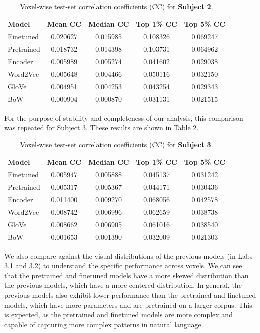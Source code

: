 \documentclass[10pt,letterpaper]{article}
\begin{document}
\begin{table}[ht]
\centering
\caption{Voxel-wise test-set correlation coefficients (CC) for \textbf{Subject 2}.}
\label{tab:cc_subject2_full}
\begin{tabular}{lcccc}
\toprule
\textbf{Model} &
\textbf{Mean CC} &
\textbf{Median CC} &
\textbf{Top 1\% CC} &
\textbf{Top 5\% CC} \\
\midrule
Finetuned  & 0.020627 & 0.015985 & 0.108326 & 0.069247 \\
Pretrained & 0.018732 & 0.014398 & 0.103731 & 0.064962 \\
Encoder    & 0.005989 & 0.005274 & 0.041602 & 0.029038 \\
Word2Vec   & 0.005648 & 0.004466 & 0.050116 & 0.032150 \\
GloVe      & 0.004951 & 0.004253 & 0.043254 & 0.029343 \\
BoW        & 0.000904 & 0.000870 & 0.031131 & 0.021515 \\
\bottomrule
\end{tabular}
\end{table}

For the purpose of stability and completeness of our analysis, this comparison was repeated for Subject 3. These results are shown in Table \ref{tab:cc_subject3_full}.



\begin{table}[ht]
\centering
\caption{Voxel-wise test-set correlation coefficients (CC) for \textbf{Subject 3}.}
\label{tab:cc_subject3_full}
\begin{tabular}{lcccc}
\toprule
\textbf{Model} &
\textbf{Mean CC} &
\textbf{Median CC} &
\textbf{Top 1\% CC} &
\textbf{Top 5\% CC} \\
\midrule
Finetuned  & 0.005947 & 0.005888 & 0.045137 & 0.031242 \\
Pretrained & 0.005317 & 0.005367 & 0.044171 & 0.030436 \\
Encoder    & 0.011400 & 0.009270 & 0.068056 & 0.042578 \\
Word2Vec   & 0.008742 & 0.006996 & 0.062659 & 0.038738 \\
GloVe      & 0.008662 & 0.006905 & 0.061016 & 0.038540 \\
BoW        & 0.001653 & 0.001390 & 0.032009 & 0.021303 \\
\bottomrule
\end{tabular}
\end{table}


We also compare against the visual distributions of the previous models (in Labs 3.1 and 3.2) to understand the specific performance across voxels. We can see that the pretrained and finetuned models have a more skewed distribution than the previous models, which have a more centered distribution. In general, the previous models also exhibit lower performance than the pretrained and finetuned models, which have more parameters and are pretrained on a larger corpus. This is expected, as the pretrained and finetuned models are more complex and capable of capturing more complex patterns in natural language.
\end{document}
